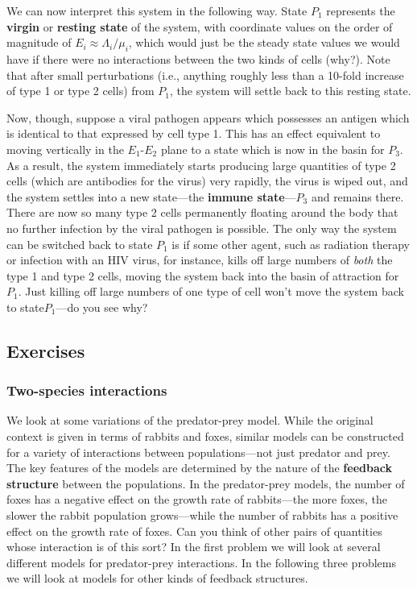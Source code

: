 We can now interpret this system in the following way.  State $P_1$
represents the {\bf virgin} or {\bf resting
  state} of the system, with coordinate values
on the order of magnitude of $E_i\approx \Lambda_i /\mu_i$, which
would just be the steady state values we would have if there were no
interactions between the two kinds of cells (why?).  Note that after
small perturbations (i.e., anything roughly less than a 10-fold
increase of type 1 or type 2 cells) from $P_1$, the system will settle
back to this resting state.

Now, though, suppose a viral pathogen appears which possesses an
antigen which is identical to that expressed by cell type 1.  This has
an effect equivalent to moving vertically in the $E_1$-$E_2$ plane to
a state which is now in the basin for $P_3$. As a result, the system
immediately starts producing large quantities of type 2 cells (which
are antibodies for the virus) very rapidly, the virus is wiped out,
and the system settles into a new state---the {\bf immune
  state}---$P_3$ and remains there.  There are
now so many type 2 cells permanently floating around the body that no
further infection by the viral pathogen is possible.  The only way the
system can be switched back to state $P_1$ is if some other agent,
such as radiation therapy or infection with an HIV virus, for
instance, kills off large numbers of {\em both\/} the type 1 and type
2 cells, moving the system back into the basin of attraction for
$P_1$.  Just killing off large numbers of one type of cell won't move
the system back to state$P_1$---do you see why?

\subsection{Exercises}
\label{subsec:exercises}

\subsubsection{Two-species interactions}
\label{subsubsec:two-species-interactions}

We look at some variations of the predator-prey model.  While the
original context is given in terms of rabbits and foxes, similar
models can be constructed for a variety of interactions between
populations---not just predator and prey.  The key features of the
models are determined by the nature of the {\bf feedback
  structure} between the populations.  In
the predator-prey models, the number of foxes has a negative effect on
the growth rate of rabbits---the more foxes, the slower the rabbit
population grows---while the number of rabbits has a positive effect
on the growth rate of foxes.  Can you think of other pairs of
quantities whose interaction is of this sort? In the first problem we
will look at several different models for predator-prey interactions.
In the following three problems we will look at models for other kinds
of feedback structures.


